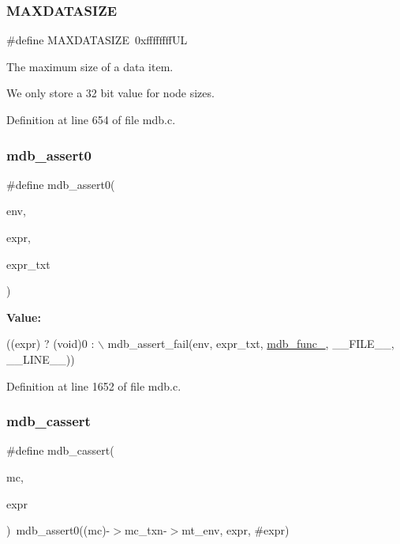 \subsubsection{\texorpdfstring{M\+A\+X\+D\+A\+T\+A\+S\+I\+ZE}{MAXDATASIZE}}
{\footnotesize\ttfamily \#define M\+A\+X\+D\+A\+T\+A\+S\+I\+ZE~0xffffffff\+UL}



The maximum size of a data item. 

We only store a 32 bit value for node sizes. 

Definition at line 654 of file mdb.\+c.

\mbox{\label{group__internal_gaf9083a40be65f748798d585f40e26056}} 
\subsubsection{\texorpdfstring{mdb\+\_\+assert0}{mdb\_assert0}}
{\footnotesize\ttfamily \#define mdb\+\_\+assert0(\begin{DoxyParamCaption}\item[{}]{env,  }\item[{}]{expr,  }\item[{}]{expr\+\_\+txt }\end{DoxyParamCaption})}

{\bfseries Value\+:}
\begin{DoxyCode}
((expr) ? (\textcolor{keywordtype}{void})0 : \(\backslash\)
        mdb\_assert\_fail(env, expr\_txt, \mbox{\hyperlink{group__compat_ga506f7f49894aad220a0b158acd6eb276}{mdb\_func\_}}, \_\_FILE\_\_, \_\_LINE\_\_))
\end{DoxyCode}


Definition at line 1652 of file mdb.\+c.

\mbox{\label{group__internal_ga2f8f04a538e4d5da1d21c02d3dba3f53}} 
\subsubsection{\texorpdfstring{mdb\+\_\+cassert}{mdb\_cassert}}
{\footnotesize\ttfamily \#define mdb\+\_\+cassert(\begin{DoxyParamCaption}\item[{}]{mc,  }\item[{}]{expr }\end{DoxyParamCaption})~mdb\+\_\+assert0((mc)-\/$>$mc\+\_\+txn-\/$>$mt\+\_\+env, expr, \#expr)}

